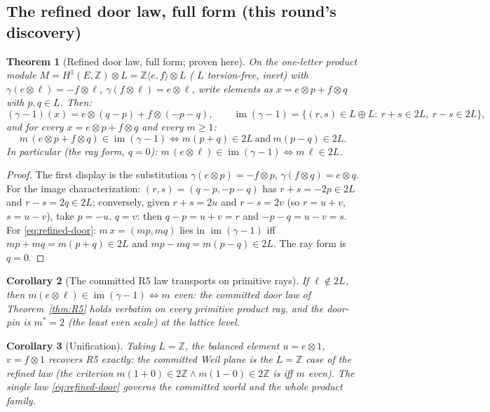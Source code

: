 \documentclass[11pt]{article}
\newcommand{\Img}{\operatorname{im}}
\newcommand{\Z}{\mathbb Z}
\newtheorem{theorem}{Theorem}[section]
\newtheorem{corollary}[theorem]{Corollary}
\begin{document}
\subsection{The refined door law, full form (this round's discovery)}

\begin{theorem}[Refined door law, full form; proven here]\label{thm:refined-door}
On the one-letter product module $M=H^1(E,\Z)\otimes L=\Z\langle
e,f\rangle\otimes L$ ( $L$ torsion-free, inert) with
$\gamma(e\otimes\ell)=-f\otimes\ell$,
$\gamma(f\otimes\ell)=e\otimes\ell$, write elements as
$x=e\otimes p+f\otimes q$ with $p,q\in L$. Then:
\[
(\gamma-1)(x)=e\otimes(q-p)+f\otimes(-p-q),
\qquad
\Img(\gamma-1)=\{(r,s)\in L\oplus L:\ r+s\in2L,\ r-s\in2L\},
\]
and for every $x=e\otimes p+f\otimes q$ and every $m\ge1$:
\begin{equation}\label{eq:refined-door}
\boxed{\;m\,(e\otimes p+f\otimes q)\in\Img(\gamma-1)\iff
m(p+q)\in2L\ \text{and}\ m(p-q)\in2L.\;}
\end{equation}
In particular (the ray form, $q=0$):
$m\,(e\otimes\ell)\in\Img(\gamma-1)\iff m\,\ell\in2L$.
\end{theorem}

\begin{proof}
The first display is the substitution
$\gamma(e\otimes p)=-f\otimes p$, $\gamma(f\otimes q)=e\otimes q$. For the
image characterization: $(r,s)=(q-p,-p-q)$ has
$r+s=-2p\in2L$ and $r-s=2q\in2L$; conversely, given $r+s=2u$ and
$r-s=2v$ (so $r=u+v$, $s=u-v$), take $p=-u$, $q=v$: then
$q-p=u+v=r$ and $-p-q=u-v=s$. For \eqref{eq:refined-door}:
$m\,x=(m p, m q)$ lies in $\Img(\gamma-1)$ iff $mp+mq=m(p+q)\in2L$ and
$mp-mq=m(p-q)\in2L$. The ray form is $q=0$.
\end{proof}

\begin{corollary}[The committed R5 law transports on primitive rays]
If $\ell\notin2L$, then
$m(e\otimes\ell)\in\Img(\gamma-1)\iff m$ even: the committed door law
of Theorem~\ref{thm:R5} holds verbatim on every primitive product ray, and
the door-pin is $m^\ast=2$ (the least even scale) at the lattice level.
\end{corollary}

\begin{corollary}[Unification]
Taking $L=\Z$, the balanced element $u=e\otimes1$, $v=f\otimes1$ recovers
R5 exactly: the committed Weil plane is the $L=\Z$ case of the refined law
(the criterion $m(1+0)\in2\Z\wedge m(1-0)\in2\Z$ is \emph{iff $m$ even}).
The single law \eqref{eq:refined-door} governs the committed world and
the whole product family.
\end{corollary}
\end{document}
